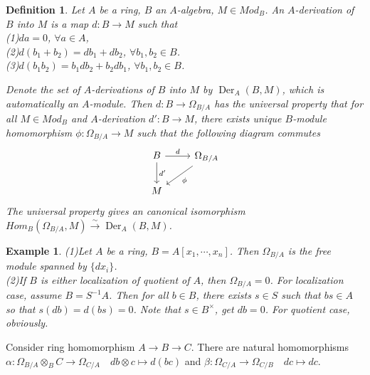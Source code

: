 \documentclass{ctexart}
\newtheorem{definition}{Definition}[section]
\newtheorem{example}{Example}[section]
\newcommand{\derivation}{\operatorname{Der}}
\begin{document}
\begin{definition}
    Let $A$ be a ring, $B$ an $A$-algebra, $M\in Mod_{B}$.
    An $A$-derivation of $B$ into $M$ is a map $d: B \longrightarrow M$ such that \\
    (1)$da = 0$, $\forall a\in A$, \\
    (2)$d(b_{1} + b_{2}) = db_{1} + db_{2}$, $\forall b_{1},b_{2}\in B$. \\
    (3)$d(b_{1}b_{2}) = b_{1}db_{2} + b_{2}db_{1}$, $\forall b_{1},b_{2}\in B$. 
    \par
    Denote the set of $A$-derivations of $B$ into $M$ by $\derivation_{A}(B, M)$, which is automatically an $A$-module.
    Then $d: B \longrightarrow \Omega_{B/A}$ has the universal property that for all $M\in Mod_{B}$ and $A$-derivation $d': B \longrightarrow M$,
    there exists unique $B$-module homomorphism $\phi: \Omega_{B/A} \longrightarrow M$ such that the following diagram commutes 
    \begin{equation*}
        \begin{tikzcd}
            B \arrow[r, "d"] \arrow[d, "{d'}"] &
            \Omega_{B/A} \arrow[dl, "\phi"] \\
            M &
        \end{tikzcd}
    \end{equation*}
    The universal property gives an canonical isomorphism $Hom_{B}(\Omega_{B/A}, M) \overset{\sim}{\longrightarrow} \derivation_{A}(B, M)$.
\end{definition}
\begin{example}
    (1)Let $A$ be a ring, $B = A[x_{1}, \cdots, x_{n}]$.
    Then $\Omega_{B/A}$ is the free module spanned by $\{dx_{i}\}$. \\
    (2)If $B$ is either localization of quotient of $A$, then $\Omega_{B/A} = 0$.
    For localization case, assume $B = S^{-1}A$.
    Then for all $b\in B$, there exists $s\in S$ such that $bs\in A$ so that $s(db) = d(bs) = 0$.
    Note that $s\in B^{\times}$, get $db = 0$.
    For quotient case, obviously.
\end{example}
Consider ring homomorphism $A \longrightarrow B \longrightarrow C$.
There are natural homomorphisms $\alpha: \Omega_{B/A} \otimes_{B} C \longrightarrow \Omega_{C/A}\quad db \otimes c \longmapsto d(bc)$ and $\beta: \Omega_{C/A} \longrightarrow \Omega_{C/B}\quad dc \longmapsto dc$.
\end{document}
